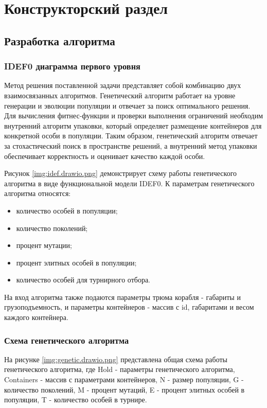 \chapter{Конструкторский раздел}
\section{Разработка алгоритма}
\subsection{IDEF0 диаграмма первого уровня}
Метод решения поставленной задачи представляет собой комбинацию двух взаимосвязанных алгоритмов. Генетический алгоритм работает на уровне генерации и эволюции популяции и отвечает за поиск оптимального решения. Для вычисления фитнес-функции и проверки выполнения ограничений необходим внутренний алгоритм упаковки, который определяет размещение контейнеров для конкретной особи в популяции. Таким образом, генетический алгоритм отвечает за стохастический поиск в пространстве решений, а внутренний метод упаковки обеспечивает корректность и оценивает качество каждой особи. 


Рисунок \ref{img:idef.drawio.png} демонстрирует схему работы генетического алгоритма в виде функциональной модели IDEF0. 
К параметрам генетического алгоритма относятся:
\begin{itemize}
	\item количество особей в популяции;
	\item количество поколений;
	\item процент мутации;
    \item процент элитных особей в популяции;
	\item количество особей для турнирного отбора.
\end{itemize}

 На вход алгоритма также подаются параметры трюма корабля - габариты и грузоподъемность, и параметры контейнеров - массив с id, габаритами и весом каждого контейнера.
\newpage
{}

\newpage
\subsection{Схема генетического алгоритма}
На рисунке \ref{img:genetic.drawio.png} представлена общая схема работы генетического алгоритма, где Hold - параметры генетического алгоритма, Containers - массив с параметрами контейнеров, N - размер популяции, G - количество поколений, M - процент мутаций, E - процент элитных особей в популяции, T - количество особей в турнире.


